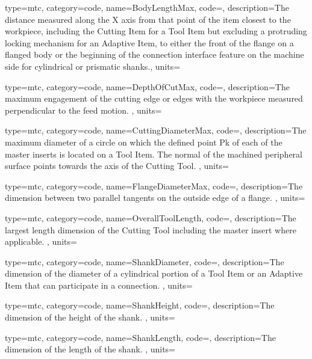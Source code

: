 {
  type=mtc,
  category=code,
  name={BodyLengthMax},
  code=,
  description={The distance measured along the X axis from that point of the item closest to the workpiece, including the Cutting Item for a Tool Item but excluding a protruding locking mechanism for an Adaptive Item, to either the front of the flange on a flanged body or the beginning of the connection interface feature on the machine side for cylindrical or prismatic shanks.},
  units=
}


{
  type=mtc,
  category=code,
  name={DepthOfCutMax},
  code=,
  description={The maximum engagement of the cutting edge or edges with the workpiece measured perpendicular to the feed motion. },
  units=
}


{
  type=mtc,
  category=code,
  name={CuttingDiameterMax},
  code=,
  description={The maximum diameter of a circle on which the defined point Pk of each of the master inserts is located on a Tool Item. The normal of the machined peripheral surface points towards the axis of the Cutting Tool. },
  units=
}


{
  type=mtc,
  category=code,
  name={FlangeDiameterMax},
  code=,
  description={The dimension between two parallel tangents on the outside edge of a flange. },
  units=
}


{
  type=mtc,
  category=code,
  name={OverallToolLength},
  code=,
  description={The largest length dimension of the Cutting Tool including the master insert where applicable.  },
  units=
}


{
  type=mtc,
  category=code,
  name={ShankDiameter},
  code=,
  description={The dimension of the diameter of a cylindrical portion of a Tool Item or an Adaptive Item that can participate in a connection. },
  units=
}


{
  type=mtc,
  category=code,
  name={ShankHeight},
  code=,
  description={The dimension of the height of the shank. },
  units=
}


{
  type=mtc,
  category=code,
  name={ShankLength},
  code=,
  description={The dimension of the length of the shank. },
  units=
}


